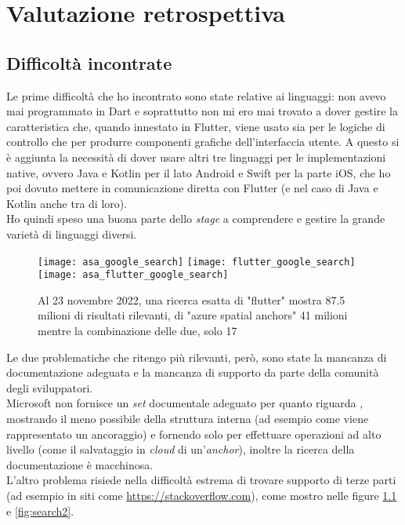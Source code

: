 
\chapter{Valutazione retrospettiva}
\label{cap:valutazione-retrospettiva}

\section{Difficoltà incontrate}
\label{sec:difficolta_incontrate}
Le prime difficoltà che ho incontrato sono state relative ai linguaggi: non avevo mai programmato in Dart e soprattutto non mi ero mai trovato a dover gestire la caratteristica che, quando innestato in Flutter, viene usato sia per le logiche di controllo che per produrre componenti grafiche dell'interfaccia utente. A questo si è aggiunta la necessità di dover usare altri tre linguaggi per le implementazioni native, ovvero Java e Kotlin per il lato Android e Swift per la parte iOS, che ho poi dovuto mettere in comunicazione diretta con Flutter (e nel caso di Java e Kotlin anche tra di loro).\\ 
Ho quindi speso una buona parte dello \textit{stage} a comprendere e gestire la grande varietà di linguaggi diversi.

\begin{figure}[H]
  \centering
  \texttt{[image: asa\_google\_search]}\hfill
  \texttt{[image: flutter\_google\_search]}\\
  \texttt{[image: asa\_flutter\_google\_search]}
  \caption[Ricerca esatta Flutter e ASA 23 novembre]{Al 23 novembre 2022, una ricerca esatta di "flutter" mostra 87.5 milioni di risultati rilevanti, di "azure spatial anchors" 41 milioni mentre la combinazione delle due, solo 17}
\label{fig:search1}
\end{figure}

Le due problematiche che ritengo più rilevanti, però, sono state la mancanza di documentazione adeguata e la mancanza di supporto da parte della comunità degli sviluppatori.\\
Microsoft non fornisce un \textit{set} documentale adeguato per quanto riguarda \asa{}, mostrando il meno possibile della struttura interna (ad esempio come viene rappresentato un ancoraggio) e fornendo solo \api{} per effettuare operazioni ad alto livello (come il salvataggio in \textit{cloud} di un'\textit{anchor}), inoltre la ricerca della documentazione è macchinosa.\\
L'altro problema risiede nella difficoltà estrema di trovare supporto di terze parti (ad esempio in siti come \url{https://stackoverflow.com}), come mostro nelle figure \ref{fig:search1} e \ref{fig:search2}.

